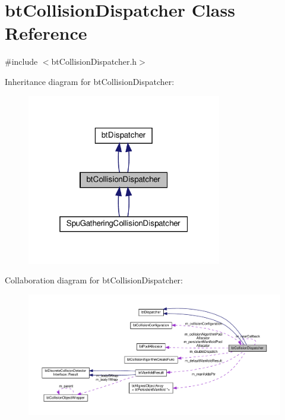 \hypertarget{classbtCollisionDispatcher}{}\section{bt\+Collision\+Dispatcher Class Reference}
\label{classbtCollisionDispatcher}


{\ttfamily \#include $<$bt\+Collision\+Dispatcher.\+h$>$}



Inheritance diagram for bt\+Collision\+Dispatcher\+:
\nopagebreak
\begin{figure}[H]
\begin{center}
\leavevmode
\includegraphics[width=241pt]{classbtCollisionDispatcher__inherit__graph}
\end{center}
\end{figure}


Collaboration diagram for bt\+Collision\+Dispatcher\+:
\nopagebreak
\begin{figure}[H]
\begin{center}
\leavevmode
\includegraphics[width=350pt]{classbtCollisionDispatcher__coll__graph}
\end{center}
\end{figure}
